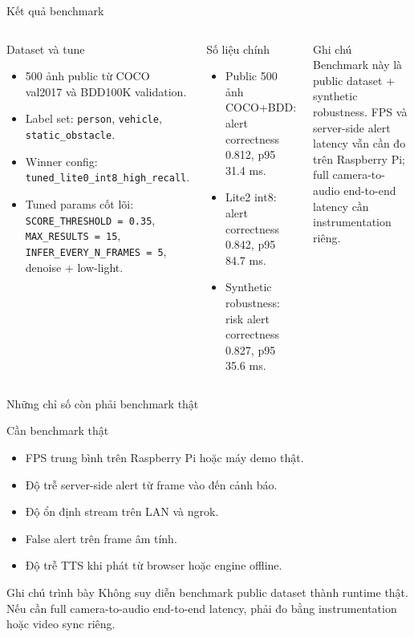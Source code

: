 \documentclass[aspectratio=169]{beamer}
\begin{document}
\begin{frame}{Kết quả benchmark}
  \scriptsize
  \begin{columns}[T,onlytextwidth]
    \begin{block}{Dataset và tune}
      \begin{itemize}
        \item 500 ảnh public từ COCO val2017 và BDD100K validation.
        \item Label set: \texttt{person}, \texttt{vehicle}, \texttt{static\_obstacle}.
        \item Winner config: \texttt{tuned\_lite0\_int8\_high\_recall}.
        \item Tuned params cốt lõi: \texttt{SCORE\_THRESHOLD = 0.35}, \texttt{MAX\_RESULTS = 15}, \texttt{INFER\_EVERY\_N\_FRAMES = 5}, denoise + low-light.
      \end{itemize}
    \end{block}
    \begin{block}{Số liệu chính}
      \begin{itemize}
        \item Public 500 ảnh COCO+BDD: alert correctness 0.812, p95 31.4 ms.
        \item Lite2 int8: alert correctness 0.842, p95 84.7 ms.
        \item Synthetic robustness: risk alert correctness 0.827, p95 35.6 ms.
      \end{itemize}
    \end{block}
    \begin{exampleblock}{Ghi chú}
      Benchmark này là public dataset + synthetic robustness. FPS và server-side alert latency vẫn cần đo trên Raspberry Pi; full camera-to-audio end-to-end latency cần instrumentation riêng.
    \end{exampleblock}
  \end{columns}
\end{frame}

\begin{frame}{Những chỉ số còn phải benchmark thật}
  \footnotesize
  \begin{block}{Cần benchmark thật}
    \begin{itemize}
      \item FPS trung bình trên Raspberry Pi hoặc máy demo thật.
      \item Độ trễ server-side alert từ frame vào đến cảnh báo.
      \item Độ ổn định stream trên LAN và ngrok.
      \item False alert trên frame âm tính.
      \item Độ trễ TTS khi phát từ browser hoặc engine offline.
    \end{itemize}
  \end{block}

  \begin{exampleblock}{Ghi chú trình bày}
    Không suy diễn benchmark public dataset thành runtime thật. Nếu cần full camera-to-audio end-to-end latency, phải đo bằng instrumentation hoặc video sync riêng.
  \end{exampleblock}
\end{frame}
\end{document}
